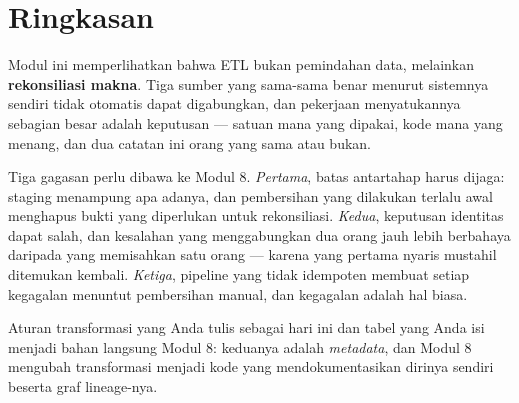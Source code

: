 \section{Ringkasan}

Modul ini memperlihatkan bahwa ETL bukan pemindahan data, melainkan
\textbf{rekonsiliasi makna}. Tiga sumber yang sama-sama benar menurut
sistemnya sendiri tidak otomatis dapat digabungkan, dan pekerjaan menyatukannya
sebagian besar adalah keputusan --- satuan mana yang dipakai, kode mana yang
menang, dan dua catatan ini orang yang sama atau bukan.

Tiga gagasan perlu dibawa ke Modul 8. \emph{Pertama}, batas antartahap harus
dijaga: staging menampung apa adanya, dan pembersihan yang dilakukan terlalu
awal menghapus bukti yang diperlukan untuk rekonsiliasi. \emph{Kedua},
keputusan identitas dapat salah, dan kesalahan yang menggabungkan dua orang
jauh lebih berbahaya daripada yang memisahkan satu orang --- karena yang
pertama nyaris mustahil ditemukan kembali. \emph{Ketiga}, pipeline yang tidak
idempoten membuat setiap kegagalan menuntut pembersihan manual, dan kegagalan
adalah hal biasa.

Aturan transformasi yang Anda tulis sebagai  hari ini dan tabel
 yang Anda isi menjadi bahan langsung Modul 8: keduanya
adalah \emph{metadata}, dan Modul 8 mengubah transformasi menjadi kode yang
mendokumentasikan dirinya sendiri beserta graf lineage-nya.
